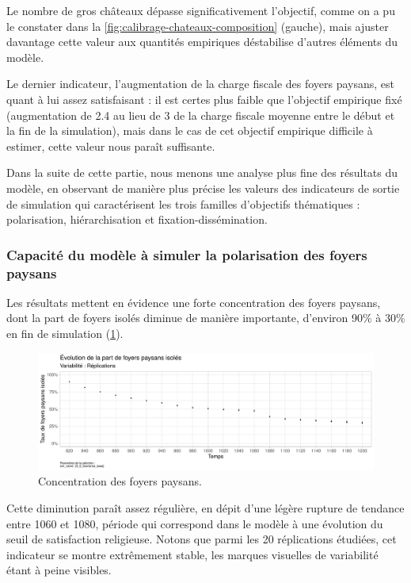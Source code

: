 Le nombre de gros châteaux dépasse significativement l'objectif, comme on a pu le constater dans la \cref{fig:calibrage-chateaux-composition} (gauche), mais ajuster davantage cette valeur aux quantités empiriques déstabilise d'autres éléments du modèle.

Le dernier indicateur, l'augmentation de la charge fiscale des foyers paysans, est quant à lui assez satisfaisant : il est certes plus faible que l'objectif empirique fixé (augmentation de 2.4 au lieu de 3 de la charge fiscale moyenne entre le début et la fin de la simulation), mais dans le cas de cet objectif empirique difficile à estimer, cette valeur nous paraît suffisante.

Dans la suite de cette partie, nous menons une analyse plus fine des résultats du modèle, en observant de manière plus précise les valeurs des indicateurs de sortie de simulation qui caractérisent les \og trois familles\fg{} d'objectifs thématiques : polarisation, hiérarchisation et fixation-dissémination.

\subsubsection{Capacité du modèle à simuler la polarisation des foyers paysans}

Les résultats mettent en évidence une forte concentration des foyers paysans, dont la part de foyers isolés diminue de manière importante, d'environ 90\% à 30\% en fin de simulation (\cref{fig:results-concentration-fp}).

\begin{figure}[H]
	\centering
	\includegraphics[width=\linewidth]{img/results_6_6/FP_Concentration_Haut.pdf}
	\caption{Concentration des foyers paysans.}
	\label{fig:results-concentration-fp}
\end{figure}

Cette diminution paraît assez régulière, en dépit d'une légère rupture de tendance entre 1060 et 1080, période qui correspond dans le modèle à une évolution du seuil de satisfaction religieuse.
Notons que parmi les 20 réplications étudiées, cet indicateur se montre extrêmement stable, les marques visuelles de variabilité étant à peine visibles.

